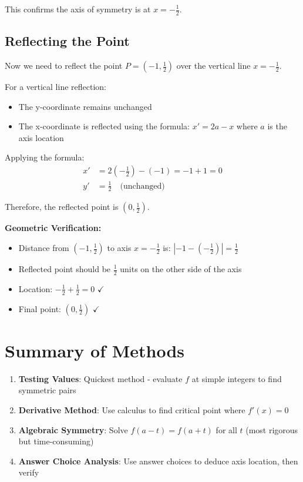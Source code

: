 \documentclass[12pt]{article}
\begin{document}
This confirms the axis of symmetry is at $x = -\frac{1}{2}$.

\subsection*{Reflecting the Point}

Now we need to reflect the point $P = \left(-1, \frac{1}{2}\right)$ over the vertical line $x = -\frac{1}{2}$.

For a vertical line reflection:
\begin{itemize}
    \item The y-coordinate remains unchanged
    \item The x-coordinate is reflected using the formula: $x' = 2a - x$ where $a$ is the axis location
\end{itemize}

Applying the formula:
\begin{align*}
x' &= 2\left(-\frac{1}{2}\right) - (-1) = -1 + 1 = 0\\
y' &= \frac{1}{2} \quad \text{(unchanged)}
\end{align*}

Therefore, the reflected point is $\boxed{\left(0, \frac{1}{2}\right)}$.

\textbf{Geometric Verification:}
\begin{itemize}
    \item Distance from $(-1, \frac{1}{2})$ to axis $x = -\frac{1}{2}$ is: $\left|-1 - \left(-\frac{1}{2}\right)\right| = \frac{1}{2}$
    \item Reflected point should be $\frac{1}{2}$ units on the other side of the axis
    \item Location: $-\frac{1}{2} + \frac{1}{2} = 0$ $\checkmark$
    \item Final point: $\left(0, \frac{1}{2}\right)$ $\checkmark$
\end{itemize}

\section*{Summary of Methods}

\begin{enumerate}
    \item \textbf{Testing Values}: Quickest method - evaluate $f$ at simple integers to find symmetric pairs
    \item \textbf{Derivative Method}: Use calculus to find critical point where $f'(x) = 0$
    \item \textbf{Algebraic Symmetry}: Solve $f(a-t) = f(a+t)$ for all $t$ (most rigorous but time-consuming)
    \item \textbf{Answer Choice Analysis}: Use answer choices to deduce axis location, then verify
\end{enumerate}
\end{document}

